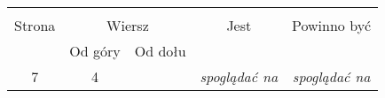 \documentclass[a4paper,11pt]{article}
\begin{document}
\begin{center}

  \begin{tabular}{|c|c|c|c|c|}
    \hline
    & \multicolumn{2}{c|}{} & & \\
    Strona & \multicolumn{2}{c|}{Wiersz} & Jest
                              & Powinno być \\ \cline{2-3}
    & Od góry & Od dołu & & \\
    \hline
    7 &  4 & & \textit{spoglądać{ } na} & \textit{spoglądać na} \\
    \hline
  \end{tabular}






\end{center}
\end{document}
